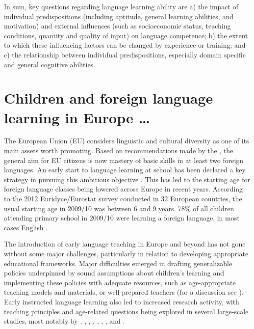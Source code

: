 \documentclass[output=paper]{langsci/langscibook}
\begin{document}
In sum, key questions regarding language learning ability are a) the impact of individual predispositions (including aptitude, general learning abilities, and motivation) and external influences (such as socioeconomic status, teaching conditions, quantity and quality of input) on language competence; b) the extent to which these influencing factors can be changed by experience or training; and c) the relationship between individual predispositions, especially domain specific and general cognitive abilities.  

\section{Children and foreign language learning in Europe …}

The European Union (EU) considers linguistic and cultural diversity as one of its main assets worth promoting. Based on recommendations made by the \citet[19]{BarcelonaEuropeanCouncil2002}, the general aim for EU citizens is now mastery of basic skills in at least two foreign languages. An early start to language learning at school has been declared a key strategy in pursuing this ambitious objective \citep{EuropeanCommission2004}. This has led to the starting age for foreign language classes being lowered across Europe in recent years. According to the 2012 Euridyce\slash Eurostat survey conducted in 32 European countries, the usual starting age in 2009/10 was between 6 and 9 years. 78\% of all children attending primary school in 2009/10 were learning a foreign language, in most cases English \citep[10f]{Eurostat2012}.

The introduction of early language teaching in Europe and beyond has not gone without some major challenges, particularly in relation to developing appropriate educational frameworks. Major difficulties emerged in drafting generalizable policies underpinned by sound assumptions about children’s learning \citep{Johnstone2009} and implementing these policies with adequate resources, such as age-appropriate teaching models and materials, or well-prepared teachers (for a discussion see \citealt{GartonEtAl2011}). Early instructed language learning also led to increased research activity, with teaching principles and age-related questions being explored in several large-scale studies, most notably by \citet{EdelenbosEtAl2006}, \citet{Muñoz2006}, \citet{NikolovCsapó2010}, \citet{Enever2011}, \citet{GartonEtAl2011}, \citet{Pfenninger2016}, \citet{JaekelEtAl2017}, and \citet{BaumertEtAl2020}.
\end{document}
